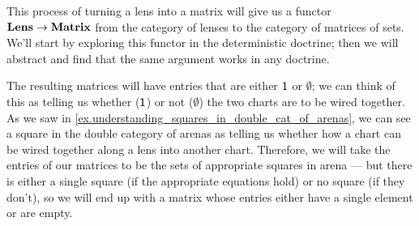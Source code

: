 \documentclass[DynamicalBook]{subfiles}
\begin{document}
This process of turning a lens into a matrix will give us a functor $\textbf{Lens}
\to \textbf{Matrix}$ from the category of lenses to the category of matrices of
sets. We'll start by exploring this functor in the deterministic doctrine; then
we will abstract and find that the same argument works in any doctrine.

The resulting matrices will have entries that are either $\mathsf{1}$ or
$\emptyset$; we can think of this as telling us whether ($\mathsf{1}$) or not ($\emptyset$) the two charts
are to be wired together. As we saw in
\cref{ex.understanding_squares_in_double_cat_of_arenas}, we can see a square in the double
category of arenas as telling us whether how a chart can be wired together along
a lens into another chart. Therefore, we will take the entries of our matrices
to be the sets of appropriate squares in arena --- but there is either a single
square (if the appropriate equations hold) or no square (if they don't), so we
will end up with a matrix whose entries either have a single element or are empty.
\end{document}
